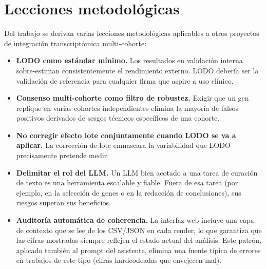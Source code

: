 \section{Lecciones metodológicas}
\label{sec:disc_lecciones}

Del trabajo se derivan varias lecciones metodológicas aplicables a otros
proyectos de integración transcriptómica multi-cohorte:

\begin{itemize}
  \item \textbf{LODO como estándar mínimo.} Los resultados en validación
  interna sobre-estiman consistentemente el rendimiento externo. LODO
  debería ser la validación de referencia para cualquier firma que
  aspire a uso clínico.
  \item \textbf{Consenso multi-cohorte como filtro de robustez.}
  Exigir que un gen replique en varias cohortes independientes elimina
  la mayoría de falsos positivos derivados de sesgos técnicos
  específicos de una cohorte.
  \item \textbf{No corregir efecto lote conjuntamente cuando LODO se va
  a aplicar.} La corrección de lote enmascara la variabilidad que LODO
  precisamente pretende medir.
  \item \textbf{Delimitar el rol del LLM.} Un LLM bien acotado a una
  tarea de curación de texto es una herramienta escalable y fiable.
  Fuera de esa tarea (por ejemplo, en la selección de genes o en la
  redacción de conclusiones), sus riesgos superan sus beneficios.
  \item \textbf{Auditoría automática de coherencia.} La interfaz web
  incluye una capa de contexto que se lee de los CSV/JSON en cada
  render, lo que garantiza que las cifras mostradas siempre reflejen el
  estado actual del análisis. Este patrón, aplicado también al prompt
  del asistente, elimina una fuente típica de errores en trabajos de
  este tipo (cifras hardcodeadas que envejecen mal).
\end{itemize}
